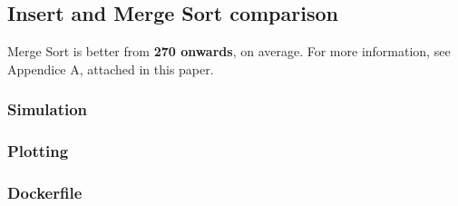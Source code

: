 \subsection{Insert and Merge Sort comparison}

Merge Sort is better from \textbf{270 onwards}, on average. For more information, see Appendice A, attached in this paper.

\subsubsection{Simulation}


\subsubsection{Plotting}


\subsubsection{Dockerfile}

